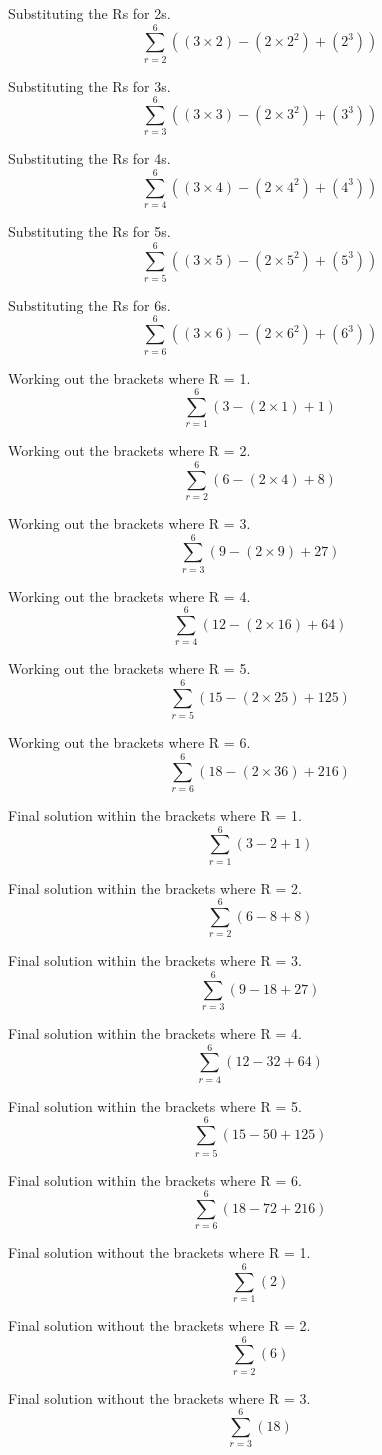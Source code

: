 \documentclass[a4paper,12pt]{article}
\begin{document}
Substituting the Rs for 2s.
\[
  \sum_{r=2}^6 ((3 \times 2) - (2 \times 2^2) + (2^3))
\]

Substituting the Rs for 3s.
\[
  \sum_{r=3}^6 ((3 \times 3) - (2 \times 3^2) + (3^3))
\]

Substituting the Rs for 4s.
\[
  \sum_{r=4}^6 ((3 \times 4) - (2 \times 4^2) + (4^3))
\]

Substituting the Rs for 5s.
\[
  \sum_{r=5}^6 ((3 \times 5) - (2 \times 5^2) + (5^3))
\]

Substituting the Rs for 6s.
\[
  \sum_{r=6}^6 ((3 \times 6) - (2 \times 6^2) + (6^3))
\]

\newpage

Working out the brackets where R = 1.
\[
  \sum^6_{r=1} (3 - (2 \times 1) + 1)
\]

Working out the brackets where R = 2.
\[
  \sum^6_{r=2} (6 - (2 \times 4) + 8)
\]

Working out the brackets where R = 3.
\[
  \sum^6_{r=3} (9 - (2 \times 9) + 27)
\]

Working out the brackets where R = 4.
\[
  \sum^6_{r=4} (12 - (2 \times 16) + 64)
\]

Working out the brackets where R = 5.
\[
  \sum^6_{r=5} (15 - (2 \times 25) + 125)
\]

Working out the brackets where R = 6.
\[
  \sum^6_{r=6} (18 - (2 \times 36) + 216)
\]

\newpage

Final solution within the brackets where R = 1.
\[
  \sum^6_{r=1} (3 - 2 + 1)
\]

Final solution within the brackets where R = 2.
\[
  \sum^6_{r=2} (6 - 8 + 8)
\]

Final solution within the brackets where R = 3.
\[
  \sum^6_{r=3} (9 - 18 + 27)
\]

Final solution within the brackets where R = 4.
\[
  \sum^6_{r=4} (12 - 32 + 64)
\]

Final solution within the brackets where R = 5.
\[
  \sum^6_{r=5} (15 - 50 + 125)
\]

Final solution within the brackets where R = 6.
\[
  \sum^6_{r=6} (18 - 72 + 216)
\]

\newpage

Final solution without the brackets where R = 1.
\[
  \sum^6_{r=1} (2)
\]

Final solution without the brackets where R = 2.
\[
  \sum^6_{r=2} (6)
\]

Final solution without the brackets where R = 3.
\[
  \sum^6_{r=3} (18)
\]
\end{document}
